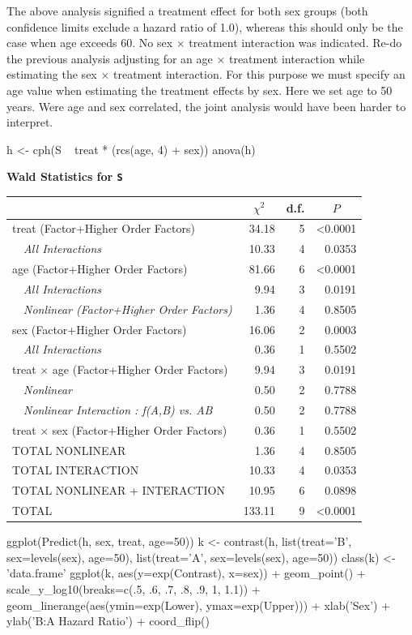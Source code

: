 The above analysis signified a treatment effect for both sex groups (both confidence limits exclude a hazard ratio of 1.0), whereas this should only be the case when age exceeds 60.  No sex $\times$ treatment interaction was indicated.
Re-do the previous analysis adjusting for an age $\times$ treatment interaction while estimating the sex $\times$ treatment interaction.  For this purpose we must specify an age value when estimating the treatment effects by sex.  Here we set age to 50 years.  Were age and sex correlated, the joint analysis would have been harder to interpret.
\begin{Sinput}
h <- cph(S ~ treat * (rcs(age, 4) + sex))
anova(h)
\end{Sinput}
\textbf{\Needspace{2in}
Wald Statistics for \texttt{\smaller S}}\begin{center}
\begin{tabular}{lrrr}
\hline\hline
\multicolumn{1}{l}{}&\multicolumn{1}{c}{$\chi^{2}$}&\multicolumn{1}{c}{d.f.}&\multicolumn{1}{c}{$P$}\tabularnewline
\hline
treat  (Factor+Higher Order Factors)& 34.18&5&\textless 0.0001\tabularnewline
~~\emph{All Interactions}& 10.33&4&0.0353\tabularnewline
age  (Factor+Higher Order Factors)& 81.66&6&\textless 0.0001\tabularnewline
~~\emph{All Interactions}&  9.94&3&0.0191\tabularnewline
~~\emph{Nonlinear (Factor+Higher Order Factors)}&  1.36&4&0.8505\tabularnewline
sex  (Factor+Higher Order Factors)& 16.06&2&0.0003\tabularnewline
~~\emph{All Interactions}&  0.36&1&0.5502\tabularnewline
treat $\times$ age  (Factor+Higher Order Factors)&  9.94&3&0.0191\tabularnewline
~~\emph{Nonlinear}&  0.50&2&0.7788\tabularnewline
~~\emph{Nonlinear Interaction : f(A,B) vs. AB}&  0.50&2&0.7788\tabularnewline
treat $\times$ sex  (Factor+Higher Order Factors)&  0.36&1&0.5502\tabularnewline
TOTAL NONLINEAR&  1.36&4&0.8505\tabularnewline
TOTAL INTERACTION& 10.33&4&0.0353\tabularnewline
TOTAL NONLINEAR + INTERACTION& 10.95&6&0.0898\tabularnewline
TOTAL&133.11&9&\textless 0.0001\tabularnewline
\hline
\end{tabular}\end{center}
\begin{Sinput}
ggplot(Predict(h, sex, treat, age=50))
k <- contrast(h, list(treat='B', sex=levels(sex), age=50),
                 list(treat='A', sex=levels(sex), age=50))
class(k) <- 'data.frame'
ggplot(k, aes(y=exp(Contrast), x=sex)) + geom_point() + scale_y_log10(breaks=c(.5, .6, .7, .8, .9, 1, 1.1)) +
  geom_linerange(aes(ymin=exp(Lower), ymax=exp(Upper))) + 
  xlab('Sex') + ylab('B:A Hazard Ratio') + coord_flip()
\end{Sinput}


